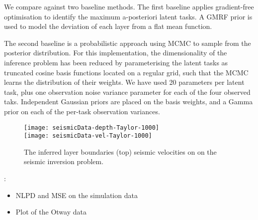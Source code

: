 We compare against two baseline methods. The first baseline applies
gradient-free optimisation to identify the maximum a-posteriori latent tasks.
A GMRF prior is used to model the deviation of each layer from a flat mean
function.

The second baseline is a probabilistic approach using MCMC to sample from
the posterior distribution. For this implementation, the dimensionality of the 
inference problem has been reduced by parameterising the latent tasks as 
truncated cosine basis functions located on a regular grid, such that the MCMC
learns the distribution of their weights. We have used 20 parameters per
latent task, plus one observation noise variance parameter for each of the four 
observed taks. Independent Gaussian priors are placed on the basis weights, and 
a Gamma prior on each of the per-task observation variances.

\begin{figure}
\texttt{[image: seismicData-depth-Taylor-1000]} \\
\texttt{[image: seismicData-vel-Taylor-1000]}
\caption{The inferred layer boundaries (top) seismic velocities on
 on the seismic inversion problem. }
\end{figure}

:
\begin{itemize}
    \item NLPD and MSE on the simulation data
    \item Plot of the Otway data
\end{itemize}
